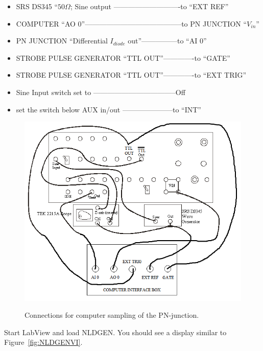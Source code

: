\documentclass{../lab}
\begin{document}
\begin{itemize}
    \item SRS DS345 ``$ 50 \Omega $; Sine output ----------------------------to ``EXT REF''

    \item COMPUTER ``AO 0''-----------------------------------------to PN JUNCTION ``$V_{in}$''

    \item PN JUNCTION ``Differential $I_{diode}$ out''---------------to ``AI 0''

    \item STROBE PULSE GENERATOR ``TTL OUT''-------------to ``GATE''

    \item STROBE PULSE GENERATOR ``TTL OUT''-------------to ``EXT TRIG''

    \item Sine Input switch set to -----------------------------------Off

    \item set the switch below AUX in/out ---------------------to ``INT''
\end{itemize}

\begin{figure}[h]
    \centering
    \href{http://experimentationlab.berkeley.edu/sites/default/files/images/NLD_PN_DIAGRAM.png}{\includegraphics[width=0.7\linewidth]{images/NLD_PN_DIAGRAM.png}}
    \caption{Connections for computer sampling of the PN-junction.}
    \label{fig:ConnectionsForComputerSamplingOfPNJunction}
\end{figure}

Start LabView and load NLDGEN. You should see a display similar to Figure~\ref{fig:NLDGENVI}.
\end{document}
